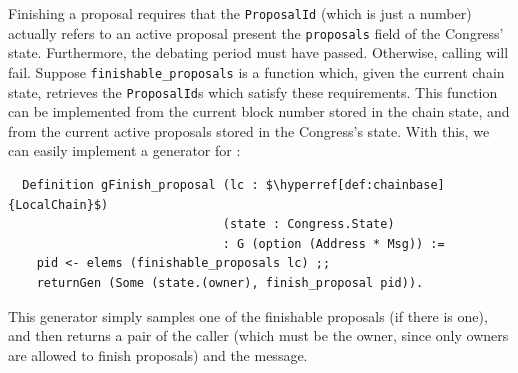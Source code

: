 \documentclass[twoside,11pt,openright]{report}
\newenvironment{code}{\captionsetup{type=figure, singlelinecheck=off, justification=raggedleft}}{}
\newcommand{\coq}[1]{\texttt{#1}}
\begin{document}
Finishing a proposal requires that the \coq{ProposalId} (which is just a number) actually refers to an active proposal present the \coq{proposals} field of the Congress' state. Furthermore, the debating period must have passed. Otherwise, calling \finishproposal{} will fail. Suppose \coq{finishable\_proposals} is a function which, given the current chain state, retrieves the \coq{ProposalId}s which satisfy these requirements. This function can be implemented from the current block number stored in the chain state, and from the current active proposals stored in the Congress's state. With this, we can easily implement a generator for \finishproposal{}:
\begin{code}
\label{def:gFinish-proposal}
\begin{verbatim}
  Definition gFinish_proposal (lc : $\hyperref[def:chainbase]{LocalChain}$)
                              (state : Congress.State)
                              : G (option (Address * Msg)) :=
    pid <- elems (finishable_proposals lc) ;;
    returnGen (Some (state.(owner), finish_proposal pid)). 
\end{verbatim}
\end{code}
This generator simply samples one of the finishable proposals (if there is one), and then returns a pair of the caller (which must be the owner, since only owners are allowed to finish proposals) and the \finishproposal{} message.
\end{document}
